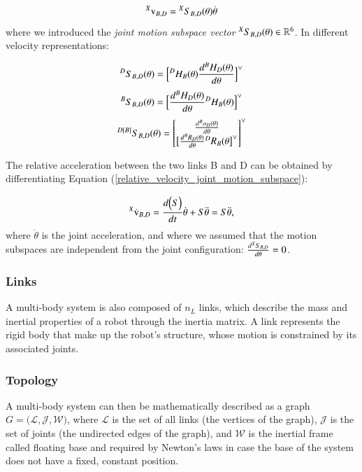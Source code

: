 \begin{equation}\label{relative_velocity_joint_motion_subspace}
    {}^{X}{\text{v}}_{B,D} = {}^{X}{S}_{B,D}(\theta)\dot{\theta}
\end{equation}
where we introduced the \textit{joint motion subspace vector} ${}^{X}{S}_{B,D}(\theta) \in \mathbb{R}^{6}$.
In different velocity representations:

\[
{}^{D}{S}_{B,D}(\theta) = \Big[{}^{D}{H}_{B}(\theta)\frac{d{}^{B}{H}_{D}(\theta)}{d\theta}\Big]^{\vee}
\]
\[
{}^{B}{S}_{B,D}(\theta) = \Big[\frac{d{}^{B}{H}_{D}(\theta)}{d\theta}{{}^{D}{H}_{B}(\theta)}\Big]^{\vee}
\]
\[
{}^{D[B]}{S}_{B,D}(\theta) = 
\begin{bmatrix}
    \frac{d{}^{B}{o}_{D}(\theta)}{d\theta}\\
    \big[ \frac{d{}^{B}{R}_{D}(\theta)}{d\theta}{}^{D}{R}_{B}(\theta \big]^\vee
\end{bmatrix}^\vee
\]

The relative acceleration between the two links B and D can be obtained by differentiating Equation (\ref{relative_velocity_joint_motion_subspace}):

\begin{equation}
    {}^{X}{\dot{\text{v}}}_{B,D} = \frac{d \Big(S \Big)}{dt}\dot{\theta} + S\ddot{\theta} = S\ddot{\theta},
\end{equation}
where $\ddot{\theta}$ is the joint acceleration, and where we assumed that the motion subspaces are independent from the joint configuration: $\frac{d {}^{X}{S}_{B,D}}{d\theta} = 0$.
 

\subsubsection{Links}\label{sssec_links}
A multi-body system is also composed of $n_L$ links, which describe the mass and inertial properties of a robot through the inertia matrix. A link represents the rigid body that make up the robot's structure, whose motion is constrained by its associated joints. 

\subsubsection{Topology}\label{sssec_topology}
A multi-body system can then be mathematically described as a graph $G = \big( \mathcal{L}, \mathcal{J}, \mathcal{W} \big)$, where $\mathcal{L}$ is the set of all links (the vertices of the graph), $\mathcal{J}$ is the set of joints (the undirected edges of the graph), and $\mathcal{W}$ is the inertial frame called floating base and required by Newton's laws in case the base of the system does not have a fixed, constant position.\\

